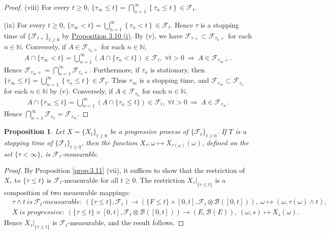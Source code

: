 \documentclass{article}
\numberwithin{equation}{section}
\theoremstyle{plain}
\newtheorem{proposition}[theorem]{Proposition}
\theoremstyle{definition}
\begin{document}
\begin{proof}
\item (viii) For every $t\geq 0$, $\{\tau_\infty\leq t\} = \bigcap_{n=1}^\infty\left\{\tau_n\leq t\right\}\in\mathscr{F}_t.$

\item (ix) For every $t\geq 0$, $\{\tau_\infty< t\} = \bigcup_{n=1}^\infty\left\{\tau_n< t\right\}\in\mathscr{F}_t$. Hence $\tau$ is a stopping time of $\{\mathscr{F}_{t+}\}_{t\geq0}$ by \hyperref[prop:3.10]{Proposition 3.10 (i)}. By (v), we have $\mathscr{F}_{\tau+}\subset\mathscr{F}_{\tau_n+}$ for each $n\in\mathbb{N}$. Conversely, if $A\in\mathscr{F}_{\tau_n+}$ for each $n\in\mathbb{N}$,
\begin{align*}
	A\cap\{\tau_\infty<t\} = \bigcup_{n=1}^\infty\left(A\cap\{\tau_n<t\}\right)\in\mathscr{F}_t,\ \forall t>0\ \Rightarrow\ A\in\mathscr{F}_{\tau_\infty +}.
\end{align*}
Hence $\mathscr{F}_{\tau_\infty+}=\bigcap_{n=1}^\infty\mathscr{F}_{\tau_n+}$. Furthermore, if $\tau_n$ is stationary, then $\{\tau_\infty\leq t\} = \bigcup_{n=1}^\infty\left\{\tau_n\leq t\right\}\in\mathscr{F}_t$.
Thus $\tau_\infty$ is a stopping time, and $\mathscr{F}_{\tau_\infty}\subset\mathscr{F}_{\tau_n}$ for each $n\in\mathbb{N}$ by (v). Conversely, if $A\in\mathscr{F}_{\tau_n}$ for each $n\in\mathbb{N}$,
\begin{align*}
	A\cap\{\tau_\infty\leq t\} = \bigcup_{n=1}^\infty\left(A\cap\{\tau_n\leq t\}\right)\in\mathscr{F}_t,\ \forall t>0\ \Rightarrow\ A\in\mathscr{F}_{\tau_\infty}.
\end{align*}
Hence $\bigcap_{n=1}^\infty\mathscr{F}_{\tau_n}=\mathscr{F}_{\tau_\infty}$.
\end{proof}

\begin{proposition}\label{prop:3.12} Let $X=\{X_t\}_{t\geq 0}$ be a progressive process of $\{\mathscr{F}_t\}_{t\geq 0}$. If $T$ is a stopping time of $\{\mathscr{F}_t\}_{t\geq 0}$, then the function $X_\tau:\omega\mapsto X_{\tau(\omega)}(\omega)$, defined on the set $\{\tau<\infty\}$, is $\mathscr{F}_\tau$-measurable.
\end{proposition}
\begin{proof}
By Proposition \ref{prop:3.11} (vii), it suffices to show that the restriction of $X_\tau$ to $\{\tau\leq t\}$ is $\mathscr{F}_t$-measurable for all $t\geq 0$. The restriction $X_\tau|_{\{\tau\leq t\}}$ is a composition of two measurable mappings:
\begin{align*}
	&\tau\wedge t\ \textit{is}\ \mathscr{F}_t\textit{-measurable}:\ (\{\tau\leq t\},\mathscr{F}_t)\to(\{F\leq t\}\times[0,t],\mathscr{F}_t\otimes\mathscr{B}([0,t])),\ \omega\mapsto \left(\omega,\tau(\omega)\wedge t\right),\\
	&X\ \textit{is progressive}:\ (\{\tau\leq t\}\times[0,t],\mathscr{F}_t\otimes\mathscr{B}([0,t]))\to(E,\mathscr{B}(E)),\ (\omega,s)\mapsto X_s(\omega).
\end{align*}
Hence $X_\tau|_{\{\tau\leq t\}}$ is $\mathscr{F}_t$-measurable, and the result follows.
\end{proof}
\end{document}
